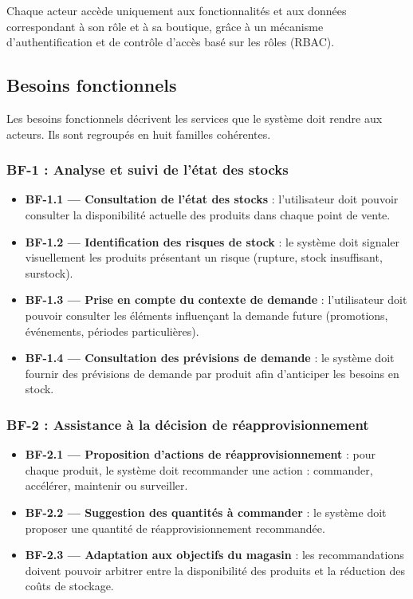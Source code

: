 Chaque acteur accède uniquement aux fonctionnalités et aux données correspondant à son rôle et à sa boutique, grâce à un mécanisme d'authentification et de contrôle d'accès basé sur les rôles (RBAC).

\subsection{Besoins fonctionnels}

Les besoins fonctionnels décrivent les services que le système doit rendre aux acteurs. Ils sont regroupés en huit familles cohérentes.

\subsubsection*{BF-1 : Analyse et suivi de l'état des stocks}
\begin{itemize}[label=--]
    \item \textbf{BF-1.1 — Consultation de l'état des stocks} : l'utilisateur doit pouvoir consulter la disponibilité actuelle des produits dans chaque point de vente.
    \item \textbf{BF-1.2 — Identification des risques de stock} : le système doit signaler visuellement les produits présentant un risque (rupture, stock insuffisant, surstock).
    \item \textbf{BF-1.3 — Prise en compte du contexte de demande} : l'utilisateur doit pouvoir consulter les éléments influençant la demande future (promotions, événements, périodes particulières).
    \item \textbf{BF-1.4 — Consultation des prévisions de demande} : le système doit fournir des prévisions de demande par produit afin d'anticiper les besoins en stock.
\end{itemize}

\subsubsection*{BF-2 : Assistance à la décision de réapprovisionnement}
\begin{itemize}[label=--]
    \item \textbf{BF-2.1 — Proposition d'actions de réapprovisionnement} : pour chaque produit, le système doit recommander une action : commander, accélérer, maintenir ou surveiller.
    \item \textbf{BF-2.2 — Suggestion des quantités à commander} : le système doit proposer une quantité de réapprovisionnement recommandée.
    \item \textbf{BF-2.3 — Adaptation aux objectifs du magasin} : les recommandations doivent pouvoir arbitrer entre la disponibilité des produits et la réduction des coûts de stockage.
\end{itemize}


